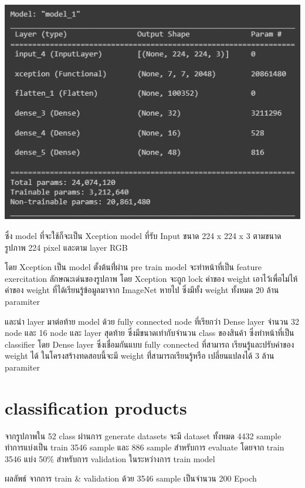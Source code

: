 \begin{center}
  \includegraphics[scale=0.45]{pic/model.png}
\end{center}
  
ซึ่ง model ที่จะใช้ก็จะเป็น Xception model ที่รับ Input ขนาด 224 x 224 x 3 ตามขนาดรูปภาพ 224 pixel และตาม layer RGB

โดย Xception เป็น model ตั้งต้นที่่ผ่าน pre train model จะทำหน้าที่เป็น feature exercitation ลักษณะเด่นของรูปภาพ
โดย Xception จะถูก lock ค่าของ weight เอาไว้เพื่อไม่ไห้ค่าของ weight ที่ได้เรียนรู้ข้อมูลมาจาก ImageNet หายไป  ซึ่งมีทั้ง weight ทั้งหมด 20 ล้าน paramiter

 และนำ layer มาต่อท้าย model ด้วย fully connected node ที่เรียกว่า Dense layer จำนวน 32 node และ 16 node และ 
layer สุดท้าย ซึ่งมีขนาดเท่ากับจำนวน class ของสินค้า ซึ่งทำหน้าที่เป็น classifier
โดย Dense layer ซึ่งเชื่อมกันแบบ fully connected ที่สามารถ เรียนรู้และปรับค่าของ weight ได้
ในโครงสร้างทดสอบนี้จะมี weight ที่่สามารถเรียนรู้หรือ เปลี่ยนแปลงได้ 3 ล้าน paramiter
   

\section{classification products}
จากรูปภาพใน 52 class ผ่านการ generate datasets จะมี dataset ทั้งหมด 4432 sample
 ทำการแบ่งเป็น train 3546 sample และ  886 sample สำหรับการ evaluate 
โดยจาก train 3546 แบ่ง 50\% สำหรับการ validation ในระหว่างการ train model

\par ผลลัพธ์ จากการ train \& validation ด้วย 3546 sample เป็นจำนวน 200 Epoch


